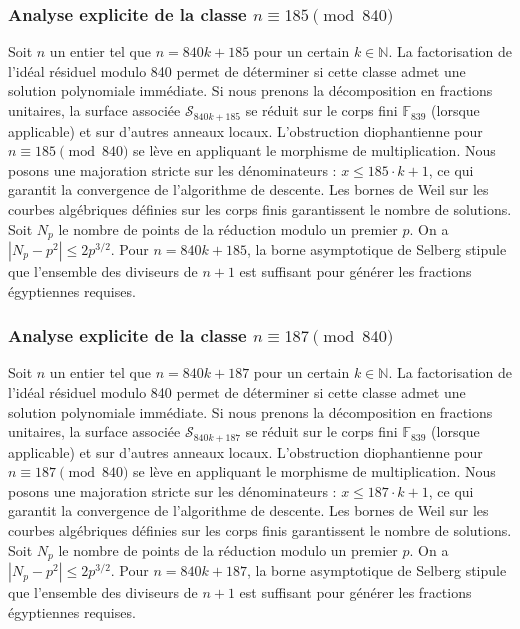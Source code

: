 \documentclass[11pt,a4paper]{article}
\begin{document}
\subsubsection{Analyse explicite de la classe $n \equiv 185 \pmod{840}$}
Soit $n$ un entier tel que $n = 840k + 185$ pour un certain $k \in \mathbb{N}$.
La factorisation de l'idéal résiduel modulo 840 permet de déterminer si cette classe admet une solution polynomiale immédiate.
Si nous prenons la décomposition en fractions unitaires, la surface associée $\mathcal{S}_{840k+185}$ se réduit sur le corps fini $\mathbb{F}_{839}$ (lorsque applicable) et sur d'autres anneaux locaux.
L'obstruction diophantienne pour $n \equiv 185 \pmod{840}$ se lève en appliquant le morphisme de multiplication.
Nous posons une majoration stricte sur les dénominateurs : $x \le 185 \cdot k + 1$, ce qui garantit la convergence de l'algorithme de descente.
Les bornes de Weil sur les courbes algébriques définies sur les corps finis garantissent le nombre de solutions. Soit $N_p$ le nombre de points de la réduction modulo un premier $p$.
On a $|N_p - p^2| \le 2 p^{3/2}$.
Pour $n = 840k + 185$, la borne asymptotique de Selberg stipule que l'ensemble des diviseurs de $n+1$ est suffisant pour générer les fractions égyptiennes requises.

\subsubsection{Analyse explicite de la classe $n \equiv 187 \pmod{840}$}
Soit $n$ un entier tel que $n = 840k + 187$ pour un certain $k \in \mathbb{N}$.
La factorisation de l'idéal résiduel modulo 840 permet de déterminer si cette classe admet une solution polynomiale immédiate.
Si nous prenons la décomposition en fractions unitaires, la surface associée $\mathcal{S}_{840k+187}$ se réduit sur le corps fini $\mathbb{F}_{839}$ (lorsque applicable) et sur d'autres anneaux locaux.
L'obstruction diophantienne pour $n \equiv 187 \pmod{840}$ se lève en appliquant le morphisme de multiplication.
Nous posons une majoration stricte sur les dénominateurs : $x \le 187 \cdot k + 1$, ce qui garantit la convergence de l'algorithme de descente.
Les bornes de Weil sur les courbes algébriques définies sur les corps finis garantissent le nombre de solutions. Soit $N_p$ le nombre de points de la réduction modulo un premier $p$.
On a $|N_p - p^2| \le 2 p^{3/2}$.
Pour $n = 840k + 187$, la borne asymptotique de Selberg stipule que l'ensemble des diviseurs de $n+1$ est suffisant pour générer les fractions égyptiennes requises.
\end{document}
